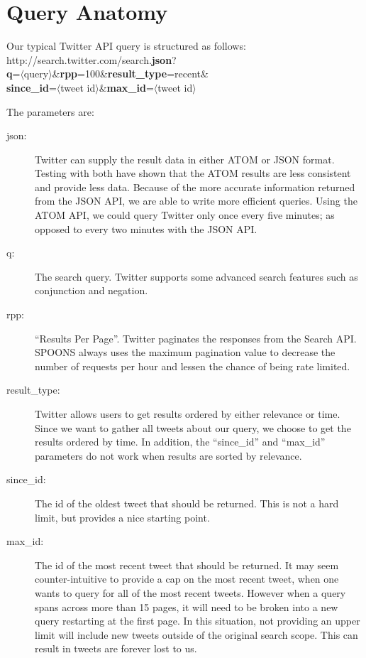 \documentclass[12pt]{ucthesis}
\begin{document}
\section{Query Anatomy}
\label{api-anatomy}
Our typical Twitter API query is structured as follows:\\
http://search.twitter.com/search.\textbf{json}?\\
\textbf{q}=$\langle$query$\rangle$\&\textbf{rpp}=100\&\textbf{result\_type}=recent\&\\
\textbf{since\_id}=$\langle$tweet id$\rangle$\&\textbf{max\_id}=$\langle$tweet id$\rangle$

The parameters are:

\begin{description}

\item[json:]
Twitter can supply the result data in either ATOM or JSON format. Testing with both have shown that the ATOM
results are less consistent and provide less data. Because of the more accurate information returned from the JSON
API, we are able to write more efficient queries. Using the ATOM API, we could query Twitter only once every five
minutes; as opposed to every two minutes with the JSON API.

\item[q:]
The search query. Twitter supports some advanced search features such as conjunction and negation.

\item[rpp:]
``Results Per Page''. Twitter paginates the responses from the Search API. SPOONS always uses the maximum pagination value to decrease the number of requests per hour and lessen the chance of being rate limited.

\item[result\_type:]
Twitter allows users to get results ordered by either relevance or time. Since we want to gather all tweets about
our query, we choose to get the results ordered by time. In addition, the ``since\_id'' and ``max\_id''
parameters do not work when results are sorted by relevance.

\item[since\_id:]
The id of the oldest tweet that should be returned. This is not a hard limit, but provides a nice starting point.

\item[max\_id:]
The id of the most recent tweet that should be returned. It may seem counter-intuitive to provide a cap on the
most recent tweet, when one wants to query for all of the most recent tweets. However when a query spans across
more than 15 pages, it will need to be broken into a new query restarting at the first page. In this situation,
not providing an upper limit will include new tweets outside of the original search scope. This can result in tweets
are forever lost to us.

\end{description}
\end{document}
